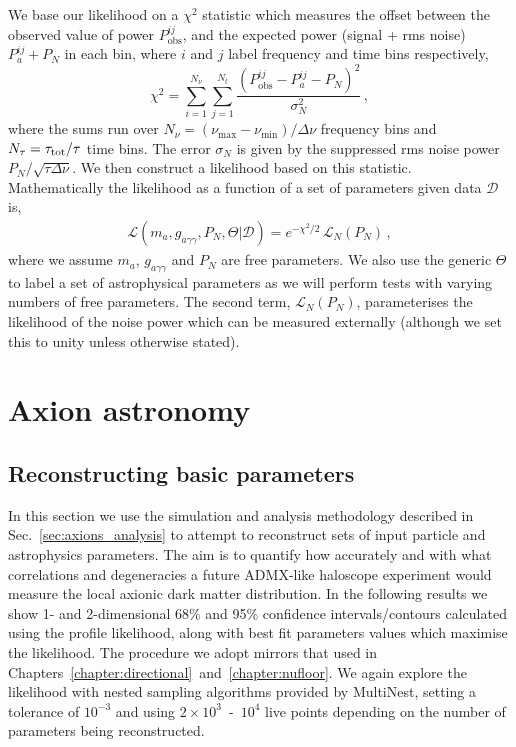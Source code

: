 We base our likelihood on a $\chi^2$ statistic which measures the offset between the observed value of power $P^{ij}_\textrm{obs}$, and the expected power (signal + rms noise) $P^{ij}_a + P_N$ in each bin, where $i$ and $j$ label frequency and time bins respectively,
\begin{equation}
 \chi^2 = \sum_{i = 1}^{N_\nu}\sum_{j = 1}^{N_t} \frac{\left(P^{ij}_\textrm{obs} - P^{ij}_a - P_N\right)^2}{\sigma^2_{N}} \, ,
\end{equation}
where the sums run over $N_\nu = (\nu_\textrm{max}-\nu_\textrm{min})/\Delta \nu$ frequency bins and $N_\tau = \tau_{\rm tot}/\tau$ time bins. The error $\sigma_N$ is given by the suppressed rms noise power $P_N/\sqrt{\tau \Delta \nu}$. We then construct a likelihood based on this statistic. Mathematically the likelihood as a function of a set of parameters given data $\mathcal{D}$ is,
\begin{eqnarray}
 \mathcal{L}(m_a,g_{a\gamma\gamma},P_N,\Theta | \mathcal{D}) = e^{-\chi^2/2}\, \mathcal{L}_N(P_N) \,,
\end{eqnarray}
where we assume $m_a$, $g_{a\gamma\gamma}$ and $P_N$ are free parameters. We also use the generic $\Theta$ to label a set of astrophysical parameters as we will perform tests with varying numbers of free parameters. The second term, $\mathcal{L}_N(P_N)$, parameterises the likelihood of the noise power which can be measured externally (although we set this to unity unless otherwise stated).


\section{Axion astronomy}\label{sec:axions_astronomy}
\subsection{Reconstructing basic parameters}\label{sec:axions_reconstruction}
In this section we use the simulation and analysis methodology described in Sec.~\ref{sec:axions_analysis} to attempt to reconstruct sets of input particle and astrophysics parameters. The aim is to quantify how accurately and with what correlations and degeneracies a future ADMX-like haloscope experiment would measure the local axionic dark matter distribution. In the following results we show 1- and 2-dimensional 68\% and 95\% confidence intervals/contours calculated using the profile likelihood, along with best fit parameters values which maximise the likelihood. The procedure we adopt mirrors that used in Chapters~\ref{chapter:directional}~and~\ref{chapter:nufloor}. We again explore the likelihood with nested sampling algorithms provided by {\sc MultiNest}, setting a tolerance of $10^{-3}$ and using $2\times 10^3$~-~$10^4$ live points depending on the number of parameters being reconstructed.

